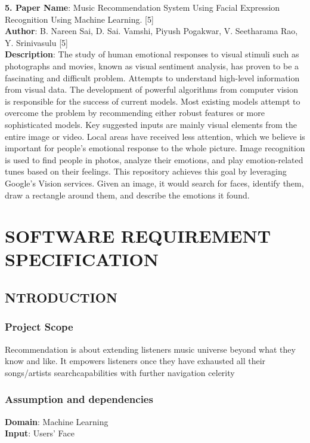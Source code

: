 \documentclass[12pt]{report}
\begin{document}
\setlength{\parindent}{0em}
\textbf{5. Paper Name}:  Music Recommendation System Using Facial Expression Recognition Using 
Machine Learning. [5]\\
\textbf{Author}: B. Nareen Sai, D. Sai. Vamshi, Piyush Pogakwar, V. Seetharama Rao, Y. 
Srinivasulu [5]\\
\textbf{Description}:  The study of human emotional responses to visual stimuli such as photographs 
and movies, known as visual sentiment analysis, has proven to be a fascinating and difficult 
problem. Attempts to understand high-level information from visual data. The development 
of powerful algorithms from computer vision is responsible for the success of current 
models. Most existing models attempt to overcome the problem by recommending either 
robust features or more sophisticated models. Key suggested inputs are mainly visual 
elements from the entire image or video. Local areas have received less attention, which we 
believe is important for people's emotional response to the whole picture. Image recognition 
is used to find people in photos, analyze their emotions, and play emotion-related tunes based 
on their feelings. This repository achieves this goal by leveraging Google's Vision services. 
Given an image, it would search for faces, identify them, draw a rectangle around them, and 
describe the emotions it found.
\clearpage

\centering
\section{SOFTWARE REQUIREMENT SPECIFICATION}
\raggedright
\subsection{NTRODUCTION}

\justifying
\setlength{\parindent}{4em}
\setlength{\parskip}{0.5em}
\renewcommand{\baselinestretch}{1.5}

\normalsize
\hspace{1.7cm}\subsubsection{Project Scope}
Recommendation is about extending listeners music universe beyond what they know and
like. It empowers listeners once they have exhausted all their songs/artists searchcapabilities
with further navigation celerity
\hspace{1.7cm}\subsubsection{ Assumption and dependencies}
\textbf{Domain}: Machine Learning\\
\textbf{Input}: Users’ Face
\end{document}
